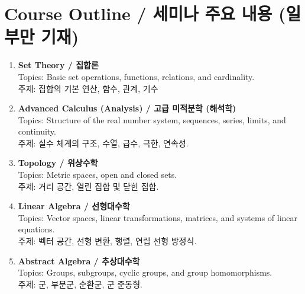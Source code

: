 	\newpage
	\section*{Course Outline / 세미나 주요 내용 (일부만 기재)}
\begin{enumerate}
\item[] \textbf{Set Theory / 집합론} \\
Topics: Basic set operations, functions, relations, and cardinality. \\
주제: 집합의 기본 연산, 함수, 관계, 기수

\item[] \textbf{Advanced Calculus (Analysis) / 고급 미적분학 (해석학)} \\
Topics: Structure of the real number system, sequences, series, limits, and continuity. \\
주제: 실수 체계의 구조, 수열, 급수, 극한, 연속성.

\item[] \textbf{Topology / 위상수학} \\
Topics: Metric spaces, open and closed sets. \\
주제: 거리 공간, 열린 집합 및 닫힌 집합.


\item[] \textbf{Linear Algebra / 선형대수학} \\
Topics: Vector spaces, linear transformations, matrices, and systems of linear equations. \\
주제: 벡터 공간, 선형 변환, 행렬, 연립 선형 방정식.


\item[] \textbf{Abstract Algebra / 추상대수학} \\
Topics: Groups, subgroups, cyclic groups, and group homomorphisms. \\
주제: 군, 부분군, 순환군, 군 준동형.


\end{enumerate}

